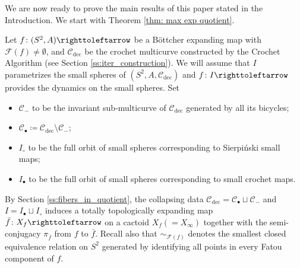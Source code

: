 \documentclass{amsart}
\theoremstyle{plain}
\theoremstyle{definition}
\theoremstyle{remark}
\renewcommand{\sp}{{\ \ }}
\newcommand{\Fat}{{\mathcal F}}
\newcommand{\CC}{{\mathcal C}}
\newcommand\selfmap{\righttoleftarrow}
\newcommand{\cro}{{\operatorname{dec}}}
\begin{document}

We are now ready to prove the main results of this paper stated in the Introduction. We start with Theorem \ref{thm: max exp quotient}.

Let $f\colon (S^2,A)\selfmap$ be a B\"ottcher expanding map with $\Fat(f)\not=\emptyset$, and $\CC_\cro$ be the crochet multicurve constructed by the Crochet Algorithm (see Section \ref{ss:iter_construction}). We will assume that $I$ parametrizes the small spheres of $(S^2,A,\CC_\cro)$ and $f\colon I \selfmap$ provides the dynamics on the small spheres. Set
\begin{itemize}
\item $\CC_-$ to be the invariant  sub-multicurve of $\CC_\cro$ generated by all its bicycles;
\item $\CC_\bullet\coloneq \CC_\cro\setminus \CC_-$;
\item $I_\circ$ to be the full orbit of small spheres corresponding to Sierpi\'{n}ski small maps; %
\item  $I_\bullet$ to be the full orbit of small spheres corresponding to small crochet maps.
\end{itemize} 
By Section \ref{ss:fibers_in_quotient}, the collapsing data $\CC_\cro = \CC_\bullet\sqcup \CC_-$ and $I=I_\bullet\sqcup I_\circ$ induces 
a totally topologically expanding map $\bar f\colon X_f\selfmap $ on a cactoid $X_f (= X_\infty)$ together with the semi-conjugacy $\pi_{\bar f}$ from $f$ to $\bar f$. 
Recall also that $\sim_{\Fat(f)}$ denotes the smallest closed equivalence relation on $S^2$ generated by identifying all points in every Fatou component of $f$. 
\end{document}
